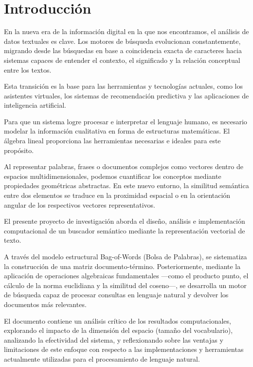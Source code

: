 \section*{Introducción}

En la nueva era de la información digital en la que nos encontramos, el análisis de datos textuales es clave. Los motores de búsqueda evolucionan constantemente, migrando desde las búsquedas en base a coincidencia exacta de caracteres hacia sistemas capaces de entender el contexto, el significado y la relación conceptual entre los textos. 

\vspace{0.2cm}
Esta transición es la base para las herramientas y tecnologías actuales, como los asistentes virtuales, los sistemas de recomendación predictiva y las aplicaciones de inteligencia artificial.

\vspace{0.4cm}
Para que un sistema logre procesar e interpretar el lenguaje humano, es necesario modelar la información cualitativa en forma de estructuras matemáticas. El álgebra lineal proporciona las herramientas necesarias e ideales para este propósito. 

\vspace{0.2cm}
Al representar palabras, frases o documentos complejos como vectores dentro de espacios multidimensionales, podemos cuantificar los conceptos mediante propiedades geométricas abstractas. En este nuevo entorno, la similitud semántica entre dos elementos se traduce en la proximidad espacial o en la orientación angular de los respectivos vectores representativos.

\vspace{0.4cm}
El presente proyecto de investigación aborda el diseño, análisis e implementación computacional de un buscador semántico mediante la representación vectorial de texto. 

\vspace{0.2cm}
A través del modelo estructural Bag-of-Words (Bolsa de Palabras), se sistematiza la construcción de una matriz documento-término. Posteriormente, mediante la aplicación de operaciones algebraicas fundamentales —como el producto punto, el cálculo de la norma euclidiana y la similitud del coseno—, se desarrolla un motor de búsqueda capaz de procesar consultas en lenguaje natural y devolver los documentos más relevantes.

\vspace{0.4cm}
El documento contiene un análisis crítico de los resultados computacionales, explorando el impacto de la dimensión del espacio (tamaño del vocabulario), analizando la efectividad del sistema, y reflexionando sobre las ventajas y limitaciones de este enfoque con respecto a las implementaciones y herramientas actualmente utilizadas para el procesamiento de lenguaje natural.
